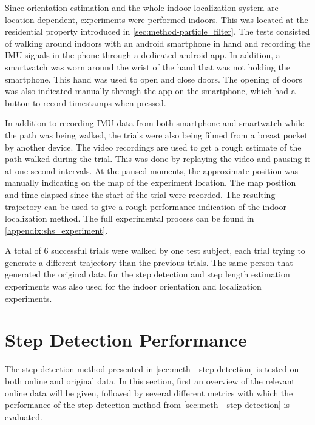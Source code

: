 Since orientation estimation and the whole indoor localization system are location-dependent, experiments were performed indoors. This was located at the residential property introduced in \cref{sec:method-particle_filter}. The tests consisted of walking around indoors with an android smartphone in hand and recording the \ac{IMU} signals in the phone through a dedicated android app. In addition, a smartwatch was worn around the wrist of the hand that was not holding the smartphone. This hand was used to open and close doors. The opening of doors was also indicated manually through the app on the smartphone, which had a button to record timestamps when pressed.\par 

In addition to recording \ac{IMU} data from both smartphone and smartwatch while the path was being walked, the trials were also being filmed from a breast pocket by another device. The video recordings are used to get a rough estimate of the path walked during the trial. This was done by replaying the video and pausing it at one second intervals. At the paused moments, the approximate position was manually indicating on the map of the experiment location. The map position and time elapsed since the start of the trial were recorded. The resulting trajectory can be used to give a rough performance indication of the indoor localization method. The full experimental process can be found in \cref{appendix:shs_experiment}. \par

A total of 6 successful trials were walked by one test subject, each trial trying to generate a different trajectory than the previous trials. The same person that generated the original data for the step detection and step length estimation experiments was also used for the indoor orientation and localization experiments.\par 


\section{Step Detection Performance}
\label{sec:results-step_detection}
The step detection method presented in \cref{sec:meth - step detection} is tested on both online and original data. In this section, first an overview of the relevant online data will be given, followed by several different metrics with which the performance of the step detection method from \cref{sec:meth - step detection} is evaluated. 



